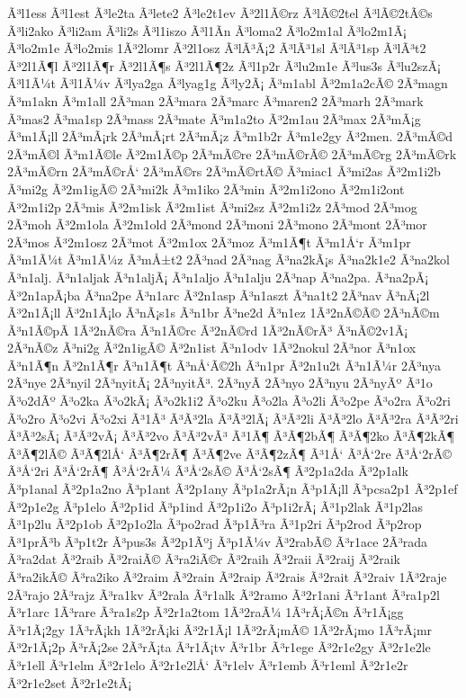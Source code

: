 {Ã³l1ess
Ã³l1est
Ã³le2ta
Ã³lete2
Ã³le2t1ev
Ã³2l1Ã©rz
Ã³lÃ©2tel
Ã³lÃ©2tÃ©s
Ã³li2ako
Ã³li2am
Ã³li2s
Ã³l1iszo
Ã³l1Ã­n
Ã³loma2
Ã³lo2m1al
Ã³lo2m1Ã¡
Ã³lo2m1e
Ã³lo2mis
1Ã³2lomr
Ã³2l1osz
Ã³lÃ³Ã¡2
Ã³lÃ³1sl
Ã³lÃ³1sp
Ã³lÃ³t2
Ã³2l1Ã¶l
Ã³2l1Ã¶r
Ã³2l1Ã¶s
Ã³2l1Ã¶2z
Ã³l1p2r
Ã³lu2m1e
Ã³lus3s
Ã³lu2szÃ¡
Ã³l1Ã¼t
Ã³l1Ã¼v
Ã³lya2ga
Ã³lyag1g
Ã³ly2Ã¡
Ã³m1abl
Ã³2m1a2cÃ©
2Ã³magn
Ã³m1akn
Ã³m1all
2Ã³man
2Ã³mara
2Ã³marc
Ã³maren2
2Ã³marh
2Ã³mark
Ã³mas2
Ã³ma1sp
2Ã³mass
2Ã³mate
Ã³m1a2to
Ã³2m1au
2Ã³max
2Ã³mÃ¡g
Ã³m1Ã¡ll
2Ã³mÃ¡rk
2Ã³mÃ¡rt
2Ã³mÃ¡z
Ã³m1b2r
Ã³m1e2gy
Ã³2men.
2Ã³mÃ©d
2Ã³mÃ©l
Ã³m1Ã©le
Ã³2m1Ã©p
2Ã³mÃ©re
2Ã³mÃ©rÃ©
2Ã³mÃ©rg
2Ã³mÃ©rk
2Ã³mÃ©rn
2Ã³mÃ©rÅ‘
2Ã³mÃ©rs
2Ã³mÃ©rtÃ©
Ã³miac1
Ã³mi2as
Ã³2m1i2b
Ã³mi2g
Ã³2m1igÃ©
2Ã³mi2k
Ã³m1iko
2Ã³min
Ã³2m1i2ono
Ã³2m1i2ont
Ã³2m1i2p
2Ã³mis
Ã³2m1isk
Ã³2m1ist
Ã³mi2sz
Ã³2m1i2z
2Ã³mod
2Ã³mog
2Ã³moh
Ã³2m1ola
Ã³2m1old
2Ã³mond
2Ã³moni
2Ã³mono
2Ã³mont
2Ã³mor
2Ã³mos
Ã³2m1osz
2Ã³mot
Ã³2m1ox
2Ã³moz
Ã³m1Ã¶t
Ã³m1Å‘r
Ã³m1pr
Ã³m1Ã¼t
Ã³m1Ã¼z
Ã³mÅ±t2
2Ã³nad
2Ã³nag
Ã³na2kÃ¡s
Ã³na2k1e2
Ã³na2kol
Ã³n1alj.
Ã³n1aljak
Ã³n1aljÃ¡
Ã³n1aljo
Ã³n1alju
2Ã³nap
Ã³na2pa.
Ã³na2pÃ¡
Ã³2n1apÃ¡ba
Ã³na2pe
Ã³n1arc
Ã³2n1asp
Ã³n1aszt
Ã³na1t2
2Ã³nav
Ã³nÃ¡2l
Ã³2n1Ã¡ll
Ã³2n1Ã¡lo
Ã³nÃ¡s1s
Ã³n1br
Ã³ne2d
Ã³n1ez
1Ã³2nÃ©Ã©
2Ã³nÃ©m
Ã³n1Ã©pÃ­
1Ã³2nÃ©ra
Ã³n1Ã©rc
Ã³2nÃ©rd
1Ã³2nÃ©rÃ³
Ã³nÃ©2v1Ã¡
2Ã³nÃ©z
Ã³ni2g
Ã³2n1igÃ©
Ã³2n1ist
Ã³n1odv
1Ã³2nokul
2Ã³nor
Ã³n1ox
Ã³n1Ã¶n
Ã³2n1Ã¶r
Ã³n1Ã¶t
Ã³nÅ‘Ã©2h
Ã³n1pr
Ã³2n1u2t
Ã³n1Ã¼r
2Ã³nya
2Ã³nye
2Ã³nyil
2Ã³nyitÃ¡
2Ã³nyitÃ³.
2Ã³nyÃ­
2Ã³nyo
2Ã³nyu
2Ã³nyÃº
Ã³1o
Ã³o2dÃº
Ã³o2ka
Ã³o2kÃ¡
Ã³o2k1i2
Ã³o2ku
Ã³o2la
Ã³o2li
Ã³o2pe
Ã³o2ra
Ã³o2ri
Ã³o2ro
Ã³o2vi
Ã³o2xi
Ã³1Ã³
Ã³Ã³2la
Ã³Ã³2lÃ¡
Ã³Ã³2li
Ã³Ã³2lo
Ã³Ã³2ra
Ã³Ã³2ri
Ã³Ã³2sÃ¡
Ã³Ã³2vÃ¡
Ã³Ã³2vo
Ã³Ã³2vÃ³
Ã³1Ã¶
Ã³Ã¶2bÃ¶
Ã³Ã¶2ko
Ã³Ã¶2kÃ¶
Ã³Ã¶2lÃ©
Ã³Ã¶2lÅ‘
Ã³Ã¶2rÃ¶
Ã³Ã¶2ve
Ã³Ã¶2zÃ¶
Ã³1Å‘
Ã³Å‘2re
Ã³Å‘2rÃ©
Ã³Å‘2ri
Ã³Å‘2rÃ¶
Ã³Å‘2rÃ¼
Ã³Å‘2sÃ©
Ã³Å‘2sÃ¶
Ã³2p1a2da
Ã³2p1alk
Ã³p1anal
Ã³2p1a2no
Ã³p1ant
Ã³2p1any
Ã³p1a2rÃ¡n
Ã³p1Ã¡ll
Ã³pcsa2p1
Ã³2p1ef
Ã³2p1e2g
Ã³p1elo
Ã³2p1id
Ã³p1ind
Ã³2p1i2o
Ã³p1i2rÃ¡
Ã³1p2lak
Ã³1p2las
Ã³1p2lu
Ã³2p1ob
Ã³2p1o2la
Ã³po2rad
Ã³p1Ã³ra
Ã³1p2ri
Ã³p2rod
Ã³p2rop
Ã³1prÃ³b
Ã³p1t2r
Ã³pus3s
Ã³2p1Ãºj
Ã³p1Ã¼v
Ã³2rabÃ©
Ã³r1ace
2Ã³rada
Ã³ra2dat
Ã³2raib
Ã³2raiÃ©
Ã³ra2iÃ©r
Ã³2raih
Ã³2raii
Ã³2raij
Ã³2raik
Ã³ra2ikÃ©
Ã³ra2iko
Ã³2raim
Ã³2rain
Ã³2raip
Ã³2rais
Ã³2rait
Ã³2raiv
1Ã³2raje
2Ã³rajo
2Ã³rajz
Ã³ra1kv
Ã³2rala
Ã³r1alk
Ã³2ramo
Ã³2r1ani
Ã³r1ant
Ã³ra1p2l
Ã³r1arc
1Ã³rare
Ã³ra1s2p
Ã³2r1a2tom
1Ã³2raÃ¼
1Ã³rÃ¡Ã©n
Ã³r1Ã¡gg
Ã³r1Ã¡2gy
1Ã³rÃ¡kh
1Ã³2rÃ¡ki
Ã³2r1Ã¡l
1Ã³2rÃ¡mÃ©
1Ã³2rÃ¡mo
1Ã³rÃ¡mr
Ã³2r1Ã¡2p
Ã³rÃ¡2se
2Ã³rÃ¡ta
Ã³r1Ã¡tv
Ã³r1br
Ã³r1ege
Ã³2r1e2gy
Ã³2r1e2le
Ã³r1ell
Ã³r1elm
Ã³2r1elo
Ã³2r1e2lÅ‘
Ã³r1elv
Ã³r1emb
Ã³r1eml
Ã³2r1e2r
Ã³2r1e2set
Ã³2r1e2tÃ¡
}
